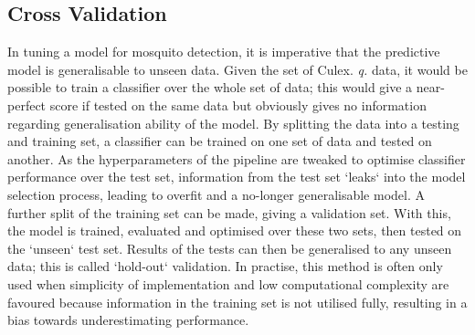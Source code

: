         
        
       
    \subsection{Cross Validation}
    \label{subsec:exp-clf-xval}
        In tuning a model for mosquito detection, it is imperative that the predictive model is generalisable to unseen data. Given the set of Culex. \textit{q.} data, it would be possible to train a classifier over the whole set of data; this would give a near-perfect score if tested on the same data but obviously gives no information regarding generalisation ability of the model. By splitting the data into a testing and training set, a classifier can be trained on one set of data and tested on another. As the hyperparameters of the pipeline are tweaked to optimise classifier performance over the test set, information from the test set `leaks` into the model selection process, leading to overfit and a no-longer generalisable model. A further split of the training set can be made, giving a validation set. With this, the model is trained, evaluated and optimised over these two sets, then tested on the `unseen` test set. Results of the tests can then be generalised to any unseen data; this is called `hold-out` validation. In practise, this method is often only used when simplicity of implementation and low computational complexity are favoured because information in the training set is not utilised fully, resulting in a bias towards underestimating performance.
     
